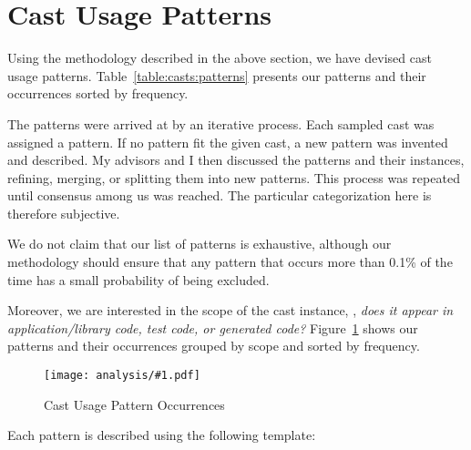 \section{Cast Usage Patterns}\label{sec:casts:patterns}

Using the methodology described in the above section,
we have devised \nPattern{} cast usage patterns.
Table~\ref{table:casts:patterns} presents our patterns and their
occurrences sorted by frequency.




The patterns were arrived at by an iterative process.
Each sampled cast was assigned a pattern.
If no pattern fit the given cast,
a new pattern was invented and described.
My advisors and I then discussed the patterns and their instances,
refining, merging, or splitting them into new patterns.
This process was repeated until consensus among us was reached.
The particular categorization here is therefore subjective.

We do not claim that our list of patterns is exhaustive,
although our methodology should ensure that any pattern that occurs more
than 0.1\% of the time has a small probability of being excluded.

Moreover, we are interested in the scope of the cast instance,
\ie, \emph{does it appear in application/library code, test code, or generated code?}
Figure~\ref{fig:casts:patterns} shows our patterns and their occurrences grouped by scope and sorted by frequency.

\newcommand\plot[3]{
\begin{figure}[ht!]
\centering
\texttt{[image: analysis/\#1.pdf]}
\caption{#3} \label{#2}
\end{figure}
}

\plot{table-patterns}{fig:casts:patterns}{Cast Usage Pattern Occurrences}

Each pattern is described using the following template:

